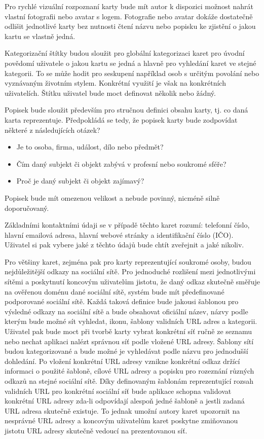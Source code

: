 	Pro rychlé vizuální rozpoznaní karty bude mít autor k dispozici možnost nahrát vlastní fotografii nebo avatar s logem.
	Fotografie nebo avatar dokáže dostatečně odlišit jednotlivé karty bez nutnosti čtení názvu nebo popisku ke zjistění o
	jakou kartu se vlastně jedná.

	Kategorizační štítky budou sloužit pro globální kategorizaci karet pro úvodní povědomí uživatele o jakou kartu se jedná
	a hlavně pro vyhledání karet ve stejné kategorii.
	To se může hodit pro seskupení například osob s určitým povolání nebo vyznávaným životním stylem.
	Konkrétní využití je však na konkrétních uživatelích.
	Štítku uživatel bude moct definovat několik nebo žádný.

	Popisek bude sloužit především pro stručnou definici obsahu karty, tj. co daná karta reprezentuje.
	Předpokládá se tedy, že popisek karty bude zodpovídat některé z následujících otázek?
	\begin{itemize}
		\item Je to osoba, firma, událost, dílo nebo předmět?
		\item Čím daný subjekt či objekt zabývá v profesní nebo soukromé sféře?
		\item Proč je daný subjekt či objekt zajímavý?
	\end{itemize}
	Popisek bude mít omezenou velikost a nebude povinný, nicméně silně doporučovaný.

	Základními kontaktními údaji se v případě těchto karet rozumí: telefonní číslo, hlavní emailová adresa, hlavní
	webové stránky a identifikační číslo (\noindent\ac{IČO}).
	Uživatel si pak vybere jaké z těchto údajů bude chtít zveřejnit a jaké nikoliv.

	Pro většiny karet, zejména pak pro karty reprezentující soukromé osoby, budou nejdůležitější odkazy na sociální sítě.
	Pro jednoduché rozlišení mezi jednotlivými sítěmi a poskytnutí koncovým uživatelům jistotu, že daný odkaz skutečně
	směřuje na ověřenou doménu dané sociální sítě, systém bude mít předefinované podporované sociální sítě.
	Každá taková definice bude jakousi šablonou pro výsledné odkazy na sociální sítě a bude obsahovat oficiální název,
	názvy podle kterým bude možné sít vyhledat, ikonu, šablony validních \ac{URL} adres a kategorii.
	Uživatel pak bude moct při tvorbě karty vybrat konkrétní síť ručně ze seznamu nebo nechat aplikaci nalézt správnou
	síť podle vložené \ac{URL} adresy.
	Šablony sítí budou kategorizované a bude možné je vyhledávat podle názvu pro jednodušší dohledání.
	Po vložení konkrétní \ac{URL} adresy vznikne konkrétní odkaz držící informaci o použité šabloně, cílové \ac{URL} adresy a
	popisku pro rozeznání různých odkazů na stejné sociální sítě.
	Díky definovaným šablonám reprezentující rozsah validních \ac{URL} pro konkrétní sociální síť bude aplikace schopna
	validovat konkrétní \ac{URL} adresy zda-li odpovídají alespoň jedné šabloně a jestli zadaná \ac{URL} adresa skutečně existuje.
	To jednak umožní autory karet upozornit na nesprávné \ac{URL} adresy a koncovým uživatelům karet poskytne zmiňovanou jistotu
	\ac{URL} adresy skutečně vedoucí na prezentovanou síť.

